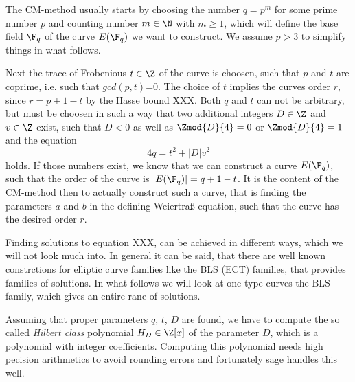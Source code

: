 
The CM-method usually starts by choosing the number $q = p^m$ for some prime number $p$ and counting number $m\in \N$ with $m\geq 1$, which will define the base field $\F_q$ of the curve $E(\F_q)$ we want to construct. We assume $p>3$ to simplify things in what follows. 

Next the trace of Frobenious $t\in \Z$ of the curve is choosen, such that $p$ and $t$ are coprime, i.e. such that $gcd(p,t)$=0. The choice of $t$ implies the curves order $r$, since $r=p+1-t$ by the Hasse bound XXX. Both $q$ and $t$ can not be arbitrary, but must be choosen in such a way that two additional integers $D\in \Z$ and $v\in \Z$ exist, such that $D<0$ as well as $\Zmod{D}{4}=0$ or $\Zmod{D}{4}=1$ and the equation
\begin{equation}
     4q  = t^2 + |D|v^2 
\end{equation}
holds. If those numbers exist, we know that we can construct a curve $E(\F_q)$, such that the order of the curve is $|E(\F_q)|= q+1-t$. It is the content of the CM-method then to actually construct such a curve, that is finding the parameters $a$ and $b$ in the defining Weiertraß equation, such that the curve has the desired order $r$. 

Finding solutions to equation XXX, can be achieved in different ways, which we will not look much into. In general it can be said, that there are well known constrctions for elliptic curve families like the BLS (ECT) families, that provides families of solutions. In what follows we will look at one type curves the BLS-family, which gives an entire rane of solutions.

Assuming that proper parameters $q$, $t$, $D$ are found, we have to compute the so called \textit{Hilbert class} polynomial $H_D\in \Z[x]$ of the parameter $D$, which is a polynomial with integer coefficients. Computing this polynomial needs high pecision arithmetics to avoid rounding errors and fortunately sage handles this well. 

